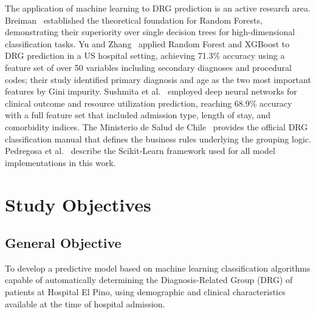 \documentclass{IEEEtran}
\begin{document}
The application of machine learning to DRG prediction is an active research area. Breiman~\cite{breiman2001} established the theoretical foundation for Random Forests, demonstrating their superiority over single decision trees for high-dimensional classification tasks. Yu and Zhang~\cite{yu2022} applied Random Forest and XGBoost to DRG prediction in a US hospital setting, achieving 71.3\% accuracy using a feature set of over 50 variables including secondary diagnoses and procedural codes; their study identified primary diagnosis and age as the two most important features by Gini impurity. Sushmita et al.~\cite{sushmita2021} employed deep neural networks for clinical outcome and resource utilization prediction, reaching 68.9\% accuracy with a full feature set that included admission type, length of stay, and comorbidity indices. The Ministerio de Salud de Chile~\cite{minsal2023} provides the official DRG classification manual that defines the business rules underlying the grouping logic. Pedregosa et al.~\cite{pedregosa2011} describe the Scikit-Learn framework used for all model implementations in this work.

\section{Study Objectives}

\subsection{General Objective}
To develop a predictive model based on machine learning classification algorithms capable of automatically determining the Diagnosis-Related Group (DRG) of patients at Hospital El Pino, using demographic and clinical characteristics available at the time of hospital admission.
\end{document}
